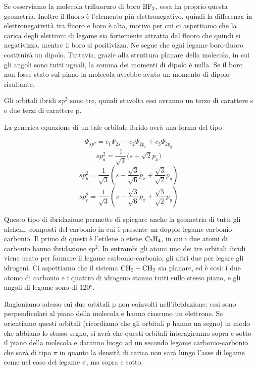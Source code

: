 Se osserviamo la molecola trifluoruro di boro $\rm BF_3$, essa ha proprio questa geometria. Inoltre il fluoro è l'elemento più elettronegativo, quindi la differenza in elettronegatività tra fluoro e boro è alta, motivo per cui ci aspettiamo che la carica degli elettroni di legame sia fortemente attratta dal fluoro che quindi si negativizza, mentre il boro si positivizza. Ne segue che ogni legame boro-fluoro costituirà un dipolo. Tuttavia, grazie alla struttura planare della molecola, in cui gli angoli sono tutti uguali, la somma dei momenti di dipolo è nulla. Se il boro non fosse stato sul piano la molecola avrebbe avuto un momento di dipolo risultante.

\vspace{0.2cm}Gli orbitali ibridi sp$^2$ sono tre, quindi stavolta essi avranno un terzo di carattere s e due terzi di carattere p.

La generica equazione di un tale orbitale ibrido avrà una forma del tipo

$$\Psi_{sp^2}=c_1\Psi_{2s} + c_2\Psi_{2p_x} + c_3\Psi_{2p_y}$$
$$sp^2_a=\frac{1}{\sqrt{3}}\Biggl(s + \sqrt{2}p_x\Biggr)
$$
$$
sp^2_b=\frac{1}{\sqrt{3}}\left(s - \frac{\sqrt{3}}{\sqrt{6}}p_x +\frac{\sqrt{3}}{\sqrt{2}}p_y\right)
$$
$$
sp^2_c=\frac{1}{\sqrt{3}}\left(s - \frac{\sqrt{3}}{\sqrt{6}}p_x + \frac{\sqrt{3}}{\sqrt{2}}p_y\right)
$$

Questo tipo di ibridazione permette di spiegare anche la geometria di tutti gli alcheni, composti del carbonio in cui è presente un doppio legame carbonio-carbonio. Il primo di questi è l'etilene o etene $\rm C_2H_4$, in cui i due atomi di carbonio hanno ibridazione sp$^2$. In entrambi gli atomi uno dei tre orbitali ibridi viene usato per formare il legame carbonio-carbonio, gli altri due per legare gli idrogeni. Ci aspettiamo che il sistema $\rm CH_2-CH_2$ sia planare, ed è così: i due atomo di carbonio e i quattro di idrogeno stanno tutti sullo stesso piano, e gli angoli di legame sono di 120°.

Ragioniamo adesso sui due orbitali p non coinvolti nell'ibridazione: essi sono perpendicolari al piano della molecola e hanno ciascuno un elettrone. Se orientiamo questi orbitali (ricordiamo che gli orbitali p hanno un segno) in modo che abbiano lo stesso segno, si avrà che questi orbitali interagiranno sopra e sotto il piano della molecola e daranno luogo ad un secondo legame carbonio-carbonio che sarà di tipo $\pi$ in quanto la densità di carica non sarà lungo l'asse di legame come nel caso del legame $\sigma$, ma sopra e sotto.

